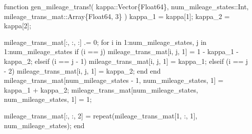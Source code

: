 \documentclass[
  letterpaper,
  DIV=11,
  numbers=noendperiod]{scrreprt}
\newenvironment{Shaded}{\begin{snugshade}}{\end{snugshade}}
\newcommand{\CharTok}[1]{\textcolor[rgb]{0.13,0.47,0.30}{#1}}
\newcommand{\ControlFlowTok}[1]{\textcolor[rgb]{0.00,0.23,0.31}{#1}}
\newcommand{\DataTypeTok}[1]{\textcolor[rgb]{0.68,0.00,0.00}{#1}}
\newcommand{\FloatTok}[1]{\textcolor[rgb]{0.68,0.00,0.00}{#1}}
\newcommand{\FunctionTok}[1]{\textcolor[rgb]{0.28,0.35,0.67}{#1}}
\newcommand{\KeywordTok}[1]{\textcolor[rgb]{0.00,0.23,0.31}{#1}}
\newcommand{\NormalTok}[1]{\textcolor[rgb]{0.00,0.23,0.31}{#1}}
\newcommand{\OperatorTok}[1]{\textcolor[rgb]{0.37,0.37,0.37}{#1}}
\begin{document}
\begin{Shaded}
\begin{Highlighting}[]
\KeywordTok{function} \FunctionTok{gen\_mileage\_trans!}\NormalTok{(}
\NormalTok{    kappa}\OperatorTok{::}\DataTypeTok{Vector\{Float64\}}\NormalTok{,}
\NormalTok{    num\_mileage\_states}\OperatorTok{::}\DataTypeTok{Int}\NormalTok{,}
\NormalTok{    mileage\_trans\_mat}\OperatorTok{::}\DataTypeTok{Array\{Float64, 3\}}
\NormalTok{    )}
\NormalTok{    kappa\_1 }\OperatorTok{=}\NormalTok{ kappa[}\FloatTok{1}\NormalTok{];}
\NormalTok{    kappa\_2 }\OperatorTok{=}\NormalTok{ kappa[}\FloatTok{2}\NormalTok{];}

\NormalTok{    mileage\_trans\_mat[}\OperatorTok{:}\NormalTok{, }\OperatorTok{:}\NormalTok{, }\OperatorTok{:}\NormalTok{] }\OperatorTok{.=} \FloatTok{0}\NormalTok{;}
    \ControlFlowTok{for}\NormalTok{ i }\KeywordTok{in} \FloatTok{1}\OperatorTok{:}\NormalTok{num\_mileage\_states, j }\KeywordTok{in} \FloatTok{1}\OperatorTok{:}\NormalTok{num\_mileage\_states}
        \ControlFlowTok{if}\NormalTok{ (i }\OperatorTok{==}\NormalTok{ j)}
\NormalTok{            mileage\_trans\_mat[i, j, }\FloatTok{1}\NormalTok{] }\OperatorTok{=} \FloatTok{1} \OperatorTok{{-}}\NormalTok{ kappa\_1 }\OperatorTok{{-}}\NormalTok{ kappa\_2;}
        \ControlFlowTok{elseif}\NormalTok{ (i }\OperatorTok{==}\NormalTok{ j }\OperatorTok{{-}} \FloatTok{1}\NormalTok{)}
\NormalTok{            mileage\_trans\_mat[i, j, }\FloatTok{1}\NormalTok{] }\OperatorTok{=}\NormalTok{ kappa\_1;}
        \ControlFlowTok{elseif}\NormalTok{ (i }\OperatorTok{==}\NormalTok{ j }\OperatorTok{{-}} \FloatTok{2}\NormalTok{)}
\NormalTok{            mileage\_trans\_mat[i, j, }\FloatTok{1}\NormalTok{] }\OperatorTok{=}\NormalTok{ kappa\_2;}
        \ControlFlowTok{end}
    \ControlFlowTok{end}
\NormalTok{    mileage\_trans\_mat[num\_mileage\_states }\OperatorTok{{-}} \FloatTok{1}\NormalTok{, num\_mileage\_states, }\FloatTok{1}\NormalTok{] }\OperatorTok{=}\NormalTok{ kappa\_1 }\OperatorTok{+}\NormalTok{ kappa\_2;}
\NormalTok{    mileage\_trans\_mat[num\_mileage\_states, num\_mileage\_states, }\FloatTok{1}\NormalTok{] }\OperatorTok{=} \FloatTok{1}\NormalTok{;}

\NormalTok{    mileage\_trans\_mat[}\OperatorTok{:}\NormalTok{, }\OperatorTok{:}\NormalTok{, }\FloatTok{2}\NormalTok{] }\OperatorTok{=} \FunctionTok{repeat}\NormalTok{(mileage\_trans\_mat[}\FloatTok{1}\NormalTok{, }\OperatorTok{:}\NormalTok{, }\FloatTok{1}\NormalTok{]}\CharTok{\textquotesingle{}, num\_mileage\_states);}
\KeywordTok{end}
\end{Highlighting}
\end{Shaded}
\end{document}
